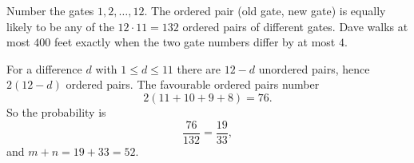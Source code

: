 Number the gates $1,2,\dots,12$. The ordered pair (old gate, new gate) is equally likely to be any of the $12\cdot 11=132$ ordered pairs of different gates. Dave walks at most $400$ feet exactly when the two gate numbers differ by at most $4$.

For a difference $d$ with $1\le d\le 11$ there are $12-d$ unordered pairs, hence $2(12-d)$ ordered pairs. The favourable ordered pairs number
\[
2\left(11+10+9+8\right)=76 .
\]
So the probability is
\[
\dfrac{76}{132}=\dfrac{19}{33},
\]
and $m+n=19+33=\boxed{52}$.
